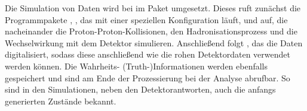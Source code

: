 Die Simulation von Daten wird bei \lhcb im \gauss Paket \cite{gauss} umgesetzt. Dieses ruft zunächst die Programmpakete \evtgen \cite{evtgen}, \pythia \cite{pythia6,pythia8}, das mit einer speziellen \lhcb Konfiguration \cite{lhcbconf} läuft, und \geant \cite{geant1,geant2} auf, die nacheinander die Proton-Proton-Kollisionen, den Hadronisationsprozess und die Wechselwirkung mit dem Detektor simulieren. Anschließend folgt \boole \cite{boole}, das die Daten digitalisiert, sodass diese anschließend wie die rohen Detektordaten verwendet werden können. Die Wahrheits- (Truth-)Informationen werden ebenfalls gespeichert und sind am Ende der Prozessierung bei der Analyse abrufbar. So sind in den Simulationen, neben den Detektorantworten, auch die anfangs generierten Zustände bekannt.  
